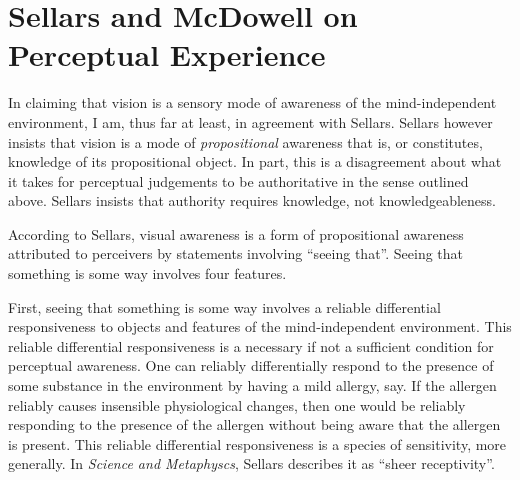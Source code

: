 \documentclass[12pt]{article}
\begin{document}

\section{Sellars and McDowell on Perceptual Experience} %
\label{sec:mcdowell_on_sellars_on_perception}

In claiming that vision is a sensory mode of awareness of the mind-independent environment, I am, thus far at least, in agreement with Sellars. Sellars however insists that vision is a mode of \emph{propositional} awareness that is, or constitutes, knowledge of its propositional object. In part, this is a disagreement about what it takes for perceptual judgements to be authoritative in the sense outlined above. Sellars insists that authority requires knowledge, not knowledgeableness.  %

According to Sellars, visual awareness is a form of propositional awareness attributed to perceivers by statements involving ``seeing that''. Seeing that something is some way involves four features.

First, seeing that something is some way involves a reliable differential responsiveness to objects and features of the mind-independent environment. This reliable differential responsiveness is a necessary if not a sufficient condition for perceptual awareness. One can reliably differentially respond to the presence of some substance in the environment by having a mild allergy, say. If the allergen reliably causes insensible physiological changes, then one would be reliably responding to the presence of the allergen without being aware that the allergen is present. This reliable differential responsiveness is a species of sensitivity, more generally. In \emph{Science and Metaphyscs}, Sellars describes it as ``sheer receptivity''.
\end{document}
